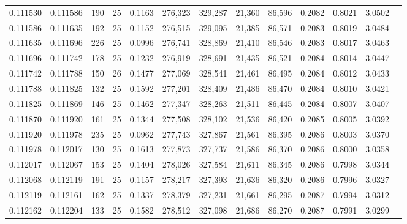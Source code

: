 \begin{tabular}{rrrrrrrrrrrrr}
0.111530 & 0.111586 &   190 &  25 &                                     0.1163 & 276,323 & 329,287 &  21,360 &  86,596 & 0.2082 & 0.8021 & 3.0502 \\
0.111586 & 0.111635 &   192 &  25 &                                     0.1152 & 276,515 & 329,095 &  21,385 &  86,571 & 0.2083 & 0.8019 & 3.0484 \\
0.111635 & 0.111696 &   226 &  25 &                                     0.0996 & 276,741 & 328,869 &  21,410 &  86,546 & 0.2083 & 0.8017 & 3.0463 \\
0.111696 & 0.111742 &   178 &  25 &                                     0.1232 & 276,919 & 328,691 &  21,435 &  86,521 & 0.2084 & 0.8014 & 3.0447 \\
0.111742 & 0.111788 &   150 &  26 &                                     0.1477 & 277,069 & 328,541 &  21,461 &  86,495 & 0.2084 & 0.8012 & 3.0433 \\
0.111788 & 0.111825 &   132 &  25 &                                     0.1592 & 277,201 & 328,409 &  21,486 &  86,470 & 0.2084 & 0.8010 & 3.0421 \\
0.111825 & 0.111869 &   146 &  25 &                                     0.1462 & 277,347 & 328,263 &  21,511 &  86,445 & 0.2084 & 0.8007 & 3.0407 \\
0.111870 & 0.111920 &   161 &  25 &                                     0.1344 & 277,508 & 328,102 &  21,536 &  86,420 & 0.2085 & 0.8005 & 3.0392 \\
0.111920 & 0.111978 &   235 &  25 &                                     0.0962 & 277,743 & 327,867 &  21,561 &  86,395 & 0.2086 & 0.8003 & 3.0370 \\
0.111978 & 0.112017 &   130 &  25 &                                     0.1613 & 277,873 & 327,737 &  21,586 &  86,370 & 0.2086 & 0.8000 & 3.0358 \\
0.112017 & 0.112067 &   153 &  25 &                                     0.1404 & 278,026 & 327,584 &  21,611 &  86,345 & 0.2086 & 0.7998 & 3.0344 \\
0.112068 & 0.112119 &   191 &  25 &                                     0.1157 & 278,217 & 327,393 &  21,636 &  86,320 & 0.2086 & 0.7996 & 3.0327 \\
0.112119 & 0.112161 &   162 &  25 &                                     0.1337 & 278,379 & 327,231 &  21,661 &  86,295 & 0.2087 & 0.7994 & 3.0312 \\
0.112162 & 0.112204 &   133 &  25 &                                     0.1582 & 278,512 & 327,098 &  21,686 &  86,270 & 0.2087 & 0.7991 & 3.0299 \\

\end{tabular}
